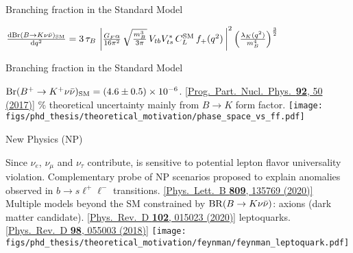 \begin{frame}{Branching fraction in the Standard Model}

\bi
\item {$ \frac{{\mathrm d}\text{\ensuremath{\mathrm{Br}}}(B\rightarrow K\nu\bar{\nu})_\text{SM}}{{\mathrm d} q^2}
=3\,
\tau_{B}\,
\left|
\frac{G_F \alpha}{16\pi^2}\,
\sqrt{\frac{m_B^3}{3\pi}}\,
V_{tb}V_{ts}^*\,
C_L^{\mathrm{SM}}\,
f_+(q^2)\,
\right|^2
\left(\frac{\lambda_K(q^2)}{m_B^4}\right)^{\frac{3}{2}}$}
\bi
{}
\ei
\ei

\end{frame}
\begin{frame}{Branching fraction in the Standard Model}

\bi
\item {$\mathrm{Br}(B^+\rightarrow K^+\nu\bar{\nu})_{\mathrm{SM}}={(4.6\pm0.5)}\times 10^{-6}$. \hfill \href{https://doi.org/10.1016/j.ppnp.2016.10.001}{\color{blue!40!gray} \tiny [{Prog.~Part.~Nucl.~Phys.~\textbf{92}, 50 (2017)]}}}
\% theoretical uncertainty mainly from $B\to K$ form factor.
\ei
\vspace{0.25cm}
\centering
\texttt{[image: figs/phd\_thesis/theoretical\_motivation/phase\_space\_vs\_ff.pdf]}

\end{frame}
\begin{frame}{New Physics (NP)}
\bi
\item Since $\nu_e$, $\nu_\mu$ and $\nu_\tau$ contribute, \BKnn is sensitive to potential lepton flavor universality violation.
\itemii Complementary probe of NP scenarios proposed to explain anomalies observed in $b\to s\ell^+\ell^-$ transitions. \hfill \href{https://doi.org/10.1016/j.physletb.2020.135769}{\color{blue!40!gray} \tiny [Phys.~Lett.~B \textbf{809}, 135769 (2020)]}
\itemii Multiple models beyond the SM constrained by $\mathrm{BR}(B\rightarrow K\nu\bar{\nu})$:
\bi
\itemiii axions (dark matter candidate). \hfill \href{https://doi.org/10.1103/PhysRevD.102.015023}{\color{blue!40!gray} \tiny [Phys.~Rev.~D \textbf{102}, 015023 (2020)]}
\itemiii leptoquarks. \hfill \href{https://doi.org/10.1103/PhysRevD.98.055003}{\color{blue!40!gray} \tiny [Phys.~Rev.~D \textbf{98}, 055003 (2018)]}
\ei
\ei
\vspace{0.2cm}
\centering
\texttt{[image: figs/phd\_thesis/theoretical\_motivation/feynman/feynman\_leptoquark.pdf]}
\end{frame}
